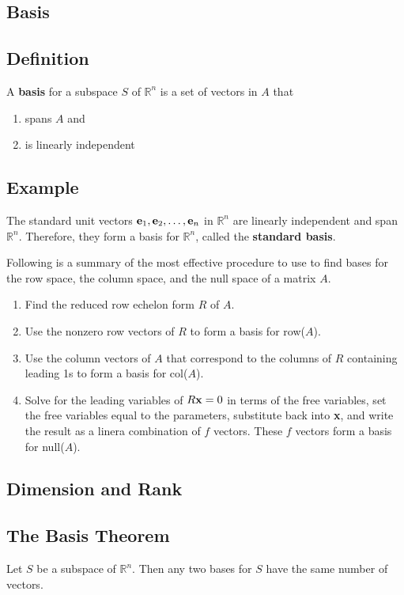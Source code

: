 \subsection*{Basis}

\subsection*{Definition}
A \textbf{basis} for a subspace $S$ of $\mathbb{R}^n$ is a set of vectors in $A$ that
\begin{enumerate}
    \item spans $A$ and
    \item is linearly independent
\end{enumerate}

\subsection*{Example}
The standard unit vectors $\mathbf{e}_1,\mathbf{e}_2,\dots,\mathbf{e}_n$ in $\mathbb{R}^n$ are linearly
independent and span $\mathbb{R}^n$. Therefore, they form a basis for $\mathbb{R}^n$,
called the \textbf{standard basis}.

Following is a summary of the most effective procedure to use to find bases for the
row space, the column space, and the null space of a matrix $A$.

\begin{enumerate}
    \item Find the reduced row echelon form $R$ of $A$.
    \item Use the nonzero row vectors of $R$ to form a basis for row($A$).
    \item Use the column vectors of $A$ that correspond to the columns of $R$
          containing leading 1s to form a basis for col($A$).
    \item Solve for the leading variables of $R\mathbf{x}=0$ in terms of the free variables,
          set the free variables equal to the parameters, substitute back into \textbf{x},
          and write the result as a linera combination of $f$ vectors. These $f$ vectors form a basis for null($A$).
\end{enumerate}

\subsection*{Dimension and Rank}

\subsection*{The Basis Theorem}
Let $S$ be a subspace of $\mathbb{R}^n$. Then any two bases for $S$ have the same
number of vectors.

